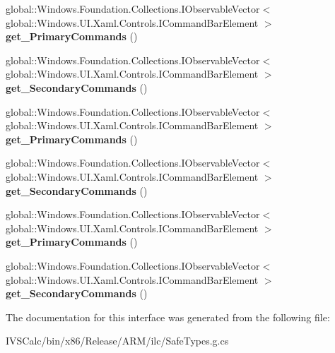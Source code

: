 \begin{DoxyCompactItemize}
\item 
\mbox{\label{interface_windows_1_1_u_i_1_1_xaml_1_1_controls_1_1_i_command_bar_a9d860b1fd007c4d2148fdc0cfca3c153}} 
global\+::\+Windows.\+Foundation.\+Collections.\+I\+Observable\+Vector$<$ global\+::\+Windows.\+U\+I.\+Xaml.\+Controls.\+I\+Command\+Bar\+Element $>$ {\bfseries get\+\_\+\+Primary\+Commands} ()
\item 
\mbox{\label{interface_windows_1_1_u_i_1_1_xaml_1_1_controls_1_1_i_command_bar_add39f6054832fd504bf4758935e12b34}} 
global\+::\+Windows.\+Foundation.\+Collections.\+I\+Observable\+Vector$<$ global\+::\+Windows.\+U\+I.\+Xaml.\+Controls.\+I\+Command\+Bar\+Element $>$ {\bfseries get\+\_\+\+Secondary\+Commands} ()
\item 
\mbox{\label{interface_windows_1_1_u_i_1_1_xaml_1_1_controls_1_1_i_command_bar_a9d860b1fd007c4d2148fdc0cfca3c153}} 
global\+::\+Windows.\+Foundation.\+Collections.\+I\+Observable\+Vector$<$ global\+::\+Windows.\+U\+I.\+Xaml.\+Controls.\+I\+Command\+Bar\+Element $>$ {\bfseries get\+\_\+\+Primary\+Commands} ()
\item 
\mbox{\label{interface_windows_1_1_u_i_1_1_xaml_1_1_controls_1_1_i_command_bar_add39f6054832fd504bf4758935e12b34}} 
global\+::\+Windows.\+Foundation.\+Collections.\+I\+Observable\+Vector$<$ global\+::\+Windows.\+U\+I.\+Xaml.\+Controls.\+I\+Command\+Bar\+Element $>$ {\bfseries get\+\_\+\+Secondary\+Commands} ()
\item 
\mbox{\label{interface_windows_1_1_u_i_1_1_xaml_1_1_controls_1_1_i_command_bar_a9d860b1fd007c4d2148fdc0cfca3c153}} 
global\+::\+Windows.\+Foundation.\+Collections.\+I\+Observable\+Vector$<$ global\+::\+Windows.\+U\+I.\+Xaml.\+Controls.\+I\+Command\+Bar\+Element $>$ {\bfseries get\+\_\+\+Primary\+Commands} ()
\item 
\mbox{\label{interface_windows_1_1_u_i_1_1_xaml_1_1_controls_1_1_i_command_bar_add39f6054832fd504bf4758935e12b34}} 
global\+::\+Windows.\+Foundation.\+Collections.\+I\+Observable\+Vector$<$ global\+::\+Windows.\+U\+I.\+Xaml.\+Controls.\+I\+Command\+Bar\+Element $>$ {\bfseries get\+\_\+\+Secondary\+Commands} ()
\end{DoxyCompactItemize}


The documentation for this interface was generated from the following file\+:\begin{DoxyCompactItemize}
\item 
I\+V\+S\+Calc/bin/x86/\+Release/\+A\+R\+M/ilc/Safe\+Types.\+g.\+cs\end{DoxyCompactItemize}
